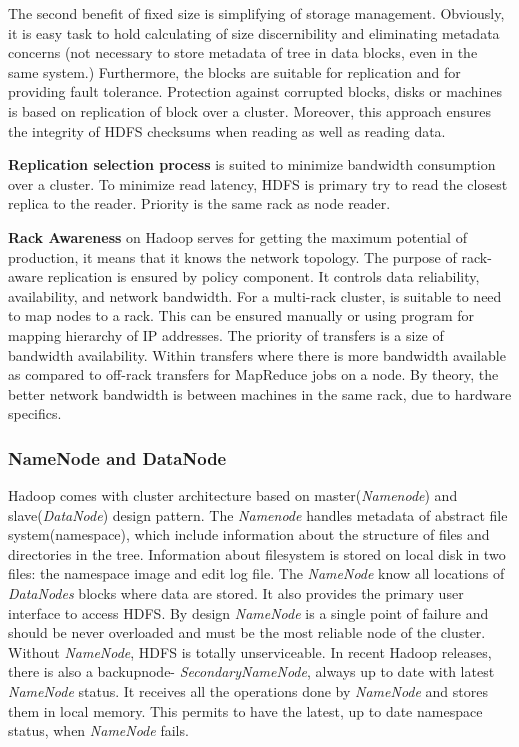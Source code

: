 \documentclass[a4paper,12pt,oneside]{report}
\begin{document}
The second benefit of fixed size is simplifying of storage management. Obviously, it is easy task
to hold calculating of size discernibility and eliminating metadata concerns (not necessary 
to store metadata of tree in data blocks, even in the same system.)
Furthermore, the blocks are suitable for replication and for providing fault tolerance. Protection
against corrupted blocks, disks or machines is based on replication of block over a cluster. 
Moreover, this approach ensures the integrity of HDFS checksums when reading as well as reading data.

\textbf{Replication selection process} is suited to minimize bandwidth consumption over a cluster. 
To minimize read latency, HDFS is primary try to read the closest replica to the reader. Priority is the 
same rack as node reader. \cite{hadoop_hdfs_web}

\textbf{Rack Awareness} on Hadoop serves for getting the maximum potential of production, 
it means that it knows the network topology. The purpose of rack-aware replication is ensured by policy 
component. It controls data reliability, availability, and network bandwidth. For a multi-rack cluster, is suitable to need to map 
nodes to a rack\cite{hadoop_rack_web}. This can be ensured manually or using program for mapping hierarchy of IP 
addresses. The priority of transfers is a size of bandwidth availability.  Within transfers 
where there is more bandwidth available as compared to off-rack transfers for MapReduce jobs on a node. 
By theory, the better network bandwidth is between machines in the same rack, due to hardware specifics.
		
		
		\subsubsection{NameNode and DataNode}
Hadoop comes with cluster architecture based on master(\textit{Namenode}) and\\ slave(\textit{DataNode}) design pattern. 
The \textit{Namenode} handles metadata of abstract file system(namespace), which include
information about the structure of files and directories in the tree. Information about filesystem is stored 
on local disk in two files: the namespace image and edit log file. 
The \textit{NameNode} know all locations of  \textit{DataNodes} blocks where data 
are stored. It also provides the primary user interface to access HDFS. 
By design \textit{NameNode}  is a single point of failure and should be never overloaded and must 
be the most reliable node of the cluster.  Without \textit{NameNode}, HDFS is totally unserviceable. 
In recent Hadoop releases, there is also a backupnode- \textit{SecondaryNameNode}, always up to date 
with latest \textit{NameNode} status. It receives all the operations done by \textit{NameNode} and 
stores them in local memory. This permits to have the latest, up to date namespace status, when \textit{NameNode} fails. 
        
\end{document}
